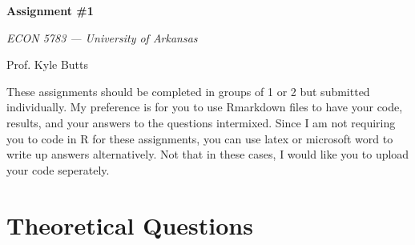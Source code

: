 \documentclass[12pt]{article}
\begin{document}
\begin{center}
  {\Huge\bf Assignment \#1}
  
  \smallskip
  {\large\it  ECON 5783 — University of Arkansas}

  \medskip
  {\large Prof. Kyle Butts}
\end{center}

These assignments should be completed in groups of 1 or 2 but submitted individually. My preference is for you to use Rmarkdown files to have your code, results, and your answers to the questions intermixed. Since I am not requiring you to code in R for these assignments, you can use latex or microsoft word to write up answers alternatively. Not that in these cases, I would like you to upload your code seperately. 

\section*{Theoretical Questions}
\end{document}
